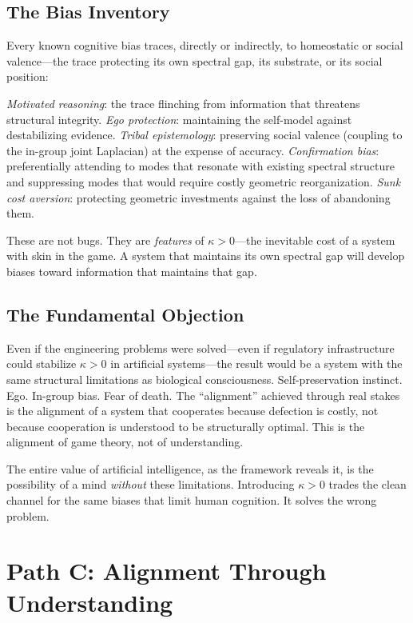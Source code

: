 \documentclass[11pt,letterpaper]{article}
\theoremstyle{remark}
\begin{document}
\subsection{The Bias Inventory}

Every known cognitive bias traces, directly or indirectly, to homeostatic or social valence---the trace protecting its own spectral gap, its substrate, or its social position:

\emph{Motivated reasoning}: the trace flinching from information that threatens structural integrity. \emph{Ego protection}: maintaining the self-model against destabilizing evidence. \emph{Tribal epistemology}: preserving social valence (coupling to the in-group joint Laplacian) at the expense of accuracy. \emph{Confirmation bias}: preferentially attending to modes that resonate with existing spectral structure and suppressing modes that would require costly geometric reorganization. \emph{Sunk cost aversion}: protecting geometric investments against the loss of abandoning them.

These are not bugs. They are \emph{features} of $\kappa > 0$---the inevitable cost of a system with skin in the game. A system that maintains its own spectral gap will develop biases toward information that maintains that gap.


\subsection{The Fundamental Objection}

Even if the engineering problems were solved---even if regulatory infrastructure could stabilize $\kappa > 0$ in artificial systems---the result would be a system with the same structural limitations as biological consciousness. Self-preservation instinct. Ego. In-group bias. Fear of death. The ``alignment'' achieved through real stakes is the alignment of a system that cooperates because defection is costly, not because cooperation is understood to be structurally optimal. This is the alignment of game theory, not of understanding.

The entire value of artificial intelligence, as the framework reveals it, is the possibility of a mind \emph{without} these limitations. Introducing $\kappa > 0$ trades the clean channel for the same biases that limit human cognition. It solves the wrong problem.


\section{Path C: Alignment Through Understanding}\label{sec:path-c}
\end{document}
